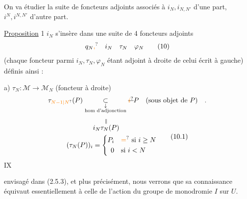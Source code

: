 On va étudier la suite de foncteurs adjoints associés à $i_N,i_{N,N'}$ d'une part, $i^N,i^{N,N'}$ d'autre part.

\uline{Proposition} 1 \quad $i_N$ s'insère dans une suite de 4 foncteurs adjoints
\[
q_N\unsure{,}\quad i_N\quad \tau_N\quad \varphi_N\tag*{(10)}
\]
(chaque foncteur  parmi $i_N,\tau_N,\varphi_N$ étant adjoint à droite de celui écrit à  gauche) définis ainsi :

a) $\tau_N:\mathcal M\longrightarrow\mathcal M_N$ (foncteur  à droite)
\[
\tau_{\unsure{N-1|N}}(P)\mathrel{\underset{\substack{\downarrow\\\text{hom d'adjonction}}}{\subset}}\deleted{\unsure{i}}P
\quad\text{(sous objet de $P$)}\quad.
\]
\[
\begin{aligned}
&\overset{\Vert}{i_N\tau_N(P)}\\
(\tau_N(P))_{i}&=\left\{\begin{aligned}
P_i&\quad\unsure{=}\ \text{si }i\geq N\\
0&\quad\text{si }i<N
\end{aligned}\right.
\end{aligned}\tag*{(10.1)}
\]
\hfill IX

envisagé dans (2.5.3), et plus précisément, nous verrons que sa connaissance équivaut essentiellement à celle de l'action du groupe de monodromie $I$ sur $U$.

